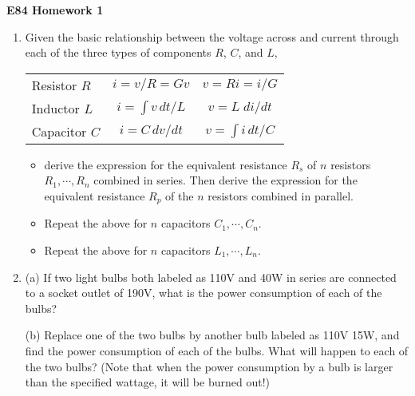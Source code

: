 \usepackage{html}

\begin{center}
{\Large \bf E84 Homework 1}
\end{center}
\begin{enumerate}

\item Given the basic relationship between the voltage across and
  current through each of the three types of components $R$, $C$,
  and $L$,
  \begin{tabular}{l|cc}
    Resistor $R$ & $i=v/R=Gv$ & $v=Ri=i/G$ \\
    Inductor $L$ & $i=\int v\,dt/L$ & $v=L\;di/dt$ \\
    Capacitor $C$ & $i=C\,dv/dt$ & $v=\int i\,dt/C$ \\
  \end{tabular}
  \begin{itemize}
  \item derive the expression for the equivalent resistance $R_s$
    of $n$ resistors $R_1,\cdots,R_n$ combined in series. Then derive 
    the expression for the equivalent resistance $R_p$ of the $n$ 
    resistors combined in parallel.
  \item Repeat the above for $n$ capacitors $C_1,\cdots,C_n$.
  \item Repeat the above for $n$ capacitors $L_1,\cdots,L_n$.
  \end{itemize}


\item (a) If two light bulbs both labeled as 110V and 40W in series are
connected to a socket outlet of 190V, what is the power consumption of 
each of the bulbs?


(b) Replace one of the two bulbs by another bulb labeled as 110V 15W, and
find the power consumption of each of the bulbs. What will happen to each
of the two bulbs? (Note that when the power consumption by a bulb is larger
than the specified wattage, it will be burned out!)


\end{enumerate}
